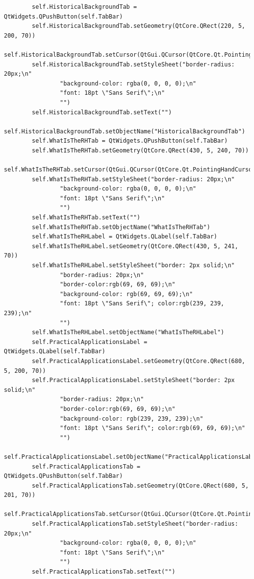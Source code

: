 \documentclass{article}
\begin{document}
\begin{lstlisting}
        self.HistoricalBackgroundTab = QtWidgets.QPushButton(self.TabBar)
        self.HistoricalBackgroundTab.setGeometry(QtCore.QRect(220, 5, 200, 70))
        self.HistoricalBackgroundTab.setCursor(QtGui.QCursor(QtCore.Qt.PointingHandCursor))
        self.HistoricalBackgroundTab.setStyleSheet("border-radius: 20px;\n"
                "background-color: rgba(0, 0, 0, 0);\n"
                "font: 18pt \"Sans Serif\";\n"
                "")
        self.HistoricalBackgroundTab.setText("")
        self.HistoricalBackgroundTab.setObjectName("HistoricalBackgroundTab")
        self.WhatIsTheRHTab = QtWidgets.QPushButton(self.TabBar)
        self.WhatIsTheRHTab.setGeometry(QtCore.QRect(430, 5, 240, 70))
        self.WhatIsTheRHTab.setCursor(QtGui.QCursor(QtCore.Qt.PointingHandCursor))
        self.WhatIsTheRHTab.setStyleSheet("border-radius: 20px;\n"
                "background-color: rgba(0, 0, 0, 0);\n"
                "font: 18pt \"Sans Serif\";\n"
                "")
        self.WhatIsTheRHTab.setText("")
        self.WhatIsTheRHTab.setObjectName("WhatIsTheRHTab")
        self.WhatIsTheRHLabel = QtWidgets.QLabel(self.TabBar)
        self.WhatIsTheRHLabel.setGeometry(QtCore.QRect(430, 5, 241, 70))
        self.WhatIsTheRHLabel.setStyleSheet("border: 2px solid;\n"
                "border-radius: 20px;\n"
                "border-color:rgb(69, 69, 69);\n"
                "background-color: rgb(69, 69, 69);\n"
                "font: 18pt \"Sans Serif\"; color:rgb(239, 239, 239);\n"
                "")
        self.WhatIsTheRHLabel.setObjectName("WhatIsTheRHLabel")
        self.PracticalApplicationsLabel = QtWidgets.QLabel(self.TabBar)
        self.PracticalApplicationsLabel.setGeometry(QtCore.QRect(680, 5, 200, 70))
        self.PracticalApplicationsLabel.setStyleSheet("border: 2px solid;\n"
                "border-radius: 20px;\n"
                "border-color:rgb(69, 69, 69);\n"
                "background-color: rgb(239, 239, 239);\n"
                "font: 18pt \"Sans Serif\"; color:rgb(69, 69, 69);\n"
                "")
        self.PracticalApplicationsLabel.setObjectName("PracticalApplicationsLabel")
        self.PracticalApplicationsTab = QtWidgets.QPushButton(self.TabBar)
        self.PracticalApplicationsTab.setGeometry(QtCore.QRect(680, 5, 201, 70))
        self.PracticalApplicationsTab.setCursor(QtGui.QCursor(QtCore.Qt.PointingHandCursor))
        self.PracticalApplicationsTab.setStyleSheet("border-radius: 20px;\n"
                "background-color: rgba(0, 0, 0, 0);\n"
                "font: 18pt \"Sans Serif\";\n"
                "")
        self.PracticalApplicationsTab.setText("")

\end{lstlisting}
\end{document}
